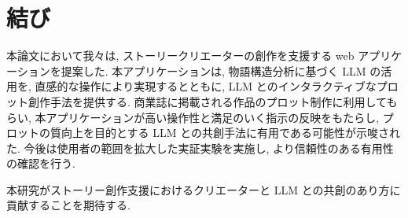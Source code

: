 \section{結び}
本論文において我々は, ストーリークリエーターの創作を支援する web アプリケーションを提案した. 本アプリケーションは, 物語構造分析に基づく LLM の活用を, 直感的な操作により実現するとともに, LLM とのインタラクティブなプロット創作手法を提供する. 商業誌に掲載される作品のプロット制作に利用してもらい, 本アプリケーションが高い操作性と満足のいく指示の反映をもたらし, プロットの質向上を目的とする LLM との共創手法に有用である可能性が示唆された. 今後は使用者の範囲を拡大した実証実験を実施し, より信頼性のある有用性の確認を行う. 

本研究がストーリー創作支援におけるクリエーターと LLM との共創のあり方に貢献することを期待する.
